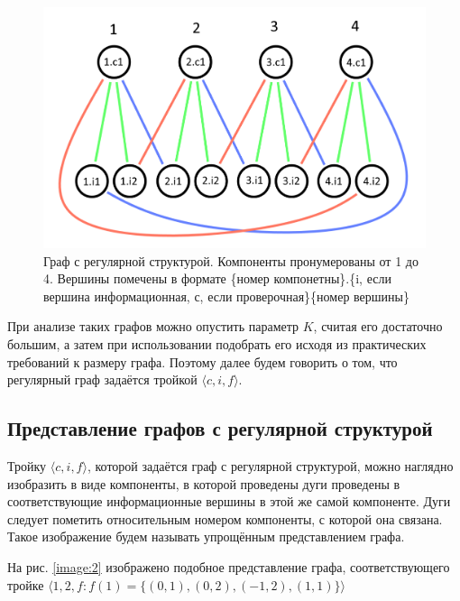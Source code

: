 \documentclass[14pt]{mmcs_article}
\begin{document}
\begin{figure}[H]
  \centering
  \includegraphics[scale=0.4]{Fig_1.png}
  \caption{ Граф с регулярной структурой. Компоненты пронумерованы от 1 до 4. Вершины помечены в формате \{номер компонетны\}.\{i, если вершина информационная, с, если проверочная\}\{номер вершины\} }\label{image:1}
\end{figure}

При анализе таких графов можно опустить параметр $K$, считая его достаточно большим, а затем при использовании подобрать его исходя из практических требований к размеру графа. Поэтому далее будем говорить о том, что регулярный граф задаётся тройкой $\langle c, i, f \rangle$.

\subsection{Представление графов с регулярной структурой}

Тройку $\langle c, i, f \rangle$, которой задаётся граф с регулярной структурой, можно наглядно изобразить в виде компоненты, в которой проведены дуги проведены в соответствующие информационные вершины в этой же самой компоненте. Дуги следует пометить относительным номером компоненты, с которой она связана. Такое изображение будем называть упрощённым представлением графа.

На рис. \ref{image:2} изображено подобное представление графа, соответствующего тройке $\langle 1, 2, f: f(1) = \{ (0, 1), (0, 2), (-1, 2), (1, 1) \} \rangle$
\end{document}
